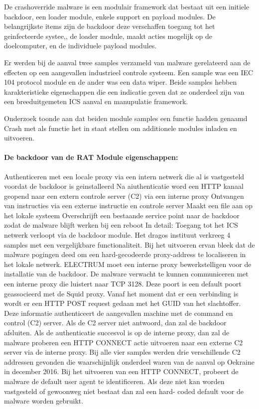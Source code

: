 {De crashoverride malware is een modulair framework dat bestaat uit een initiele backdoor, een
loader module, enkele support en payload modules.
De belangrijkste items zijn de backdoor deze verschaffen toegang tot het geinfecteerde systee,, de
loader module, maakt acties mogelijk op de doelcomputer, en de individuele payload modules.

Er werden bij de aanval twee samples verzameld van malware gerelateerd aan de effecten op een
aangevallen industrieel controle systeem. Een sample was een IEC 104 protocol module en de ander
was een data wiper. Beide samples hebben karakteristieke eigenschappen die een indicatie geven
dat ze onderdeel zijn van een breeduitgemeten ICS aanval en manupulatie framework.

Onderzoek toonde aan dat beiden module samples een functie hadden genaamd Crash met als
functie het in staat stellen om additionele modules inladen en uitvoeren.


\paragraph{De backdoor van de RAT Module eigenschappen:}

Authenticeren met een locale proxy via een intern netwerk die al is vastgesteld voordat de
backdoor is geinstalleerd
Na aiuthenticatie word een HTTP kanaal geopend naar een extern controle server (C2) via
een interne proxy
Ontvangen van instructies via een externe instructie en controle server
Maakt een file aan op het lokale systeem
Overschrijft een bestaande service point naar de backdoor zodat de malware blijft werken
bij een reboot
In detail:
Toegang tot het ICS netwerk verloopt via de backdoor module. Het dragos instituut verkreeg 4
samples met een vergelijkbare functionaliteit. Bij het uitvoeren ervan bleek dat de malware pogingen
deed om een hard-gecodeerde proxy-address te localiseren in het lokale netwerk. ELECTRUM moet
een interne proxy bewerkstelligen voor de installatie van de backdoor.
De malware verwacht te kunnen communiceren met een interne proxy die luistert naar TCP 3128.
Deze poort is een default poort geassocieerd met de Squid proxy. Vanaf het moment dat er een
verbinding is wordt er een HTTP POST request gedaan met het GUID van het slachtoffer. Deze
informatie authenticeert de aangevallen machine met de command en control (C2) server. Als de C2
server niet antwoord, dan zal de backdoor afsluiten.
Als de authenticatie succesvol is op de interne proxy, dan zal de malware proberen een HTTP
CONNECT actie uitvoeren naar een externe C2 server via de interne proxy.
Bij alle vier samples werden drie verschillende C2 addressen gevonden die waarschijnlijk onderdeel
waren van de aanval op Oekraine in december 2016.
Bij het uitvoeren van een HTTP CONNECT, probeert de malware de default user agent te
identificeren. Als deze niet kan worden vastgesteld of gewoonweg niet bestaat dan zal een hard-
coded default voor de malware worden gebruikt.

}
